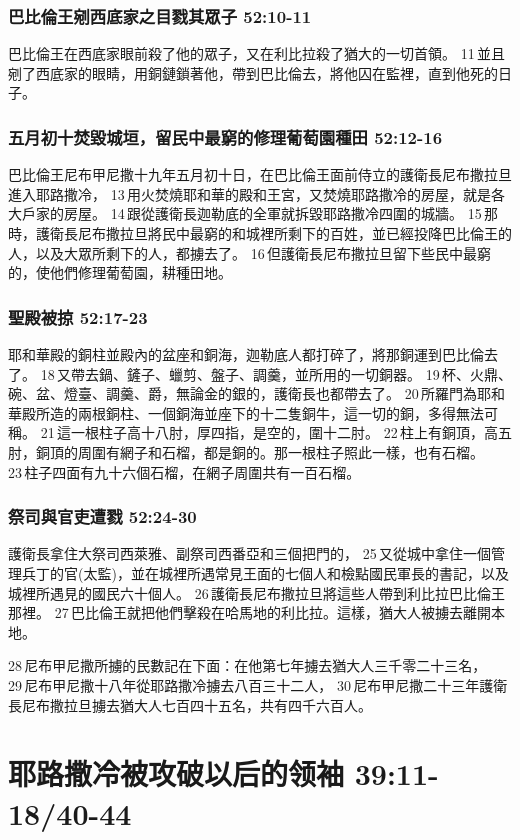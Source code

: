 \subsubsection{巴比倫王剜西底家之目戮其眾子 52:10-11}
巴比倫王在西底家眼前殺了他的眾子，又在利比拉殺了猶大的一切首領。 11 並且剜了西底家的眼睛，用銅鏈鎖著他，帶到巴比倫去，將他囚在監裡，直到他死的日子。

\subsubsection{五月初十焚毀城垣，留民中最窮的修理葡萄園種田 52:12-16}
巴比倫王尼布甲尼撒十九年五月初十日，在巴比倫王面前侍立的護衛長尼布撒拉旦進入耶路撒冷， 13 用火焚燒耶和華的殿和王宮，又焚燒耶路撒冷的房屋，就是各大戶家的房屋。 14 跟從護衛長迦勒底的全軍就拆毀耶路撒冷四圍的城牆。 15 那時，護衛長尼布撒拉旦將民中最窮的和城裡所剩下的百姓，並已經投降巴比倫王的人，以及大眾所剩下的人，都擄去了。 16 但護衛長尼布撒拉旦留下些民中最窮的，使他們修理葡萄園，耕種田地。

\subsubsection{聖殿被掠 52:17-23}
耶和華殿的銅柱並殿內的盆座和銅海，迦勒底人都打碎了，將那銅運到巴比倫去了。 18 又帶去鍋、鏟子、蠟剪、盤子、調羹，並所用的一切銅器。 19 杯、火鼎、碗、盆、燈臺、調羹、爵，無論金的銀的，護衛長也都帶去了。 20 所羅門為耶和華殿所造的兩根銅柱、一個銅海並座下的十二隻銅牛，這一切的銅，多得無法可稱。 21 這一根柱子高十八肘，厚四指，是空的，圍十二肘。 22 柱上有銅頂，高五肘，銅頂的周圍有網子和石榴，都是銅的。那一根柱子照此一樣，也有石榴。 23 柱子四面有九十六個石榴，在網子周圍共有一百石榴。

\subsubsection{祭司與官吏遭戮 52:24-30}
護衛長拿住大祭司西萊雅、副祭司西番亞和三個把門的， 25 又從城中拿住一個管理兵丁的官(太監)，並在城裡所遇常見王面的七個人和檢點國民軍長的書記，以及城裡所遇見的國民六十個人。 26 護衛長尼布撒拉旦將這些人帶到利比拉巴比倫王那裡。 27 巴比倫王就把他們擊殺在哈馬地的利比拉。這樣，猶大人被擄去離開本地。

28 尼布甲尼撒所擄的民數記在下面：在他第七年擄去猶大人三千零二十三名， 29 尼布甲尼撒十八年從耶路撒冷擄去八百三十二人， 30 尼布甲尼撒二十三年護衛長尼布撒拉旦擄去猶大人七百四十五名，共有四千六百人。



\section{耶路撒冷被攻破以后的领袖 39:11-18/40-44}
